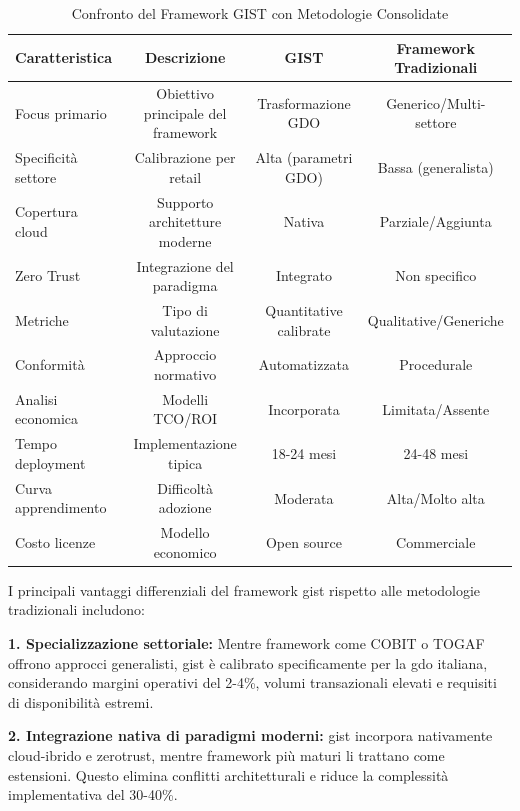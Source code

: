 \begin{table}[htbp]
\centering
\caption{Confronto del Framework GIST con Metodologie Consolidate}
\label{tab:framework_comparison_revised}
\small
\begin{tabular}[width=0.7\textwidth]{l c c c}
\toprule
\textbf{Caratteristica} & \textbf{Descrizione} & \textbf{GIST} & \textbf{Framework Tradizionali} \\
\midrule
\rowcolor{gray!10}
Focus primario & Obiettivo principale del framework & Trasformazione GDO & Generico/Multi-settore \\
Specificità settore & Calibrazione per retail & Alta (parametri GDO) & Bassa (generalista) \\
\rowcolor{gray!10}
Copertura cloud & Supporto architetture moderne & Nativa & Parziale/Aggiunta \\
Zero Trust & Integrazione del paradigma & Integrato & Non specifico \\
\rowcolor{gray!10}
Metriche & Tipo di valutazione & Quantitative calibrate & Qualitative/Generiche \\
Conformità & Approccio normativo & Automatizzata & Procedurale \\
\rowcolor{gray!10}
Analisi economica & Modelli TCO/ROI & Incorporata & Limitata/Assente \\
Tempo deployment & Implementazione tipica & 18-24 mesi & 24-48 mesi \\
\rowcolor{gray!10}
Curva apprendimento & Difficoltà adozione & Moderata & Alta/Molto alta \\
Costo licenze & Modello economico & Open source & Commerciale \\
\bottomrule
\end{tabular}
\end{table}

I principali vantaggi differenziali del framework \gls{gist} rispetto alle metodologie tradizionali includono:

\textbf{1. Specializzazione settoriale:} Mentre framework come COBIT o TOGAF offrono approcci generalisti, \gls{gist} è calibrato specificamente per la \gls{gdo} italiana, considerando margini operativi del 2-4\%, volumi transazionali elevati e requisiti di disponibilità estremi.

\textbf{2. Integrazione nativa di paradigmi moderni:} \gls{gist} incorpora nativamente cloud-ibrido e \gls{zerotrust}, mentre framework più maturi li trattano come estensioni. Questo elimina conflitti architetturali e riduce la complessità implementativa del 30-40\%.


